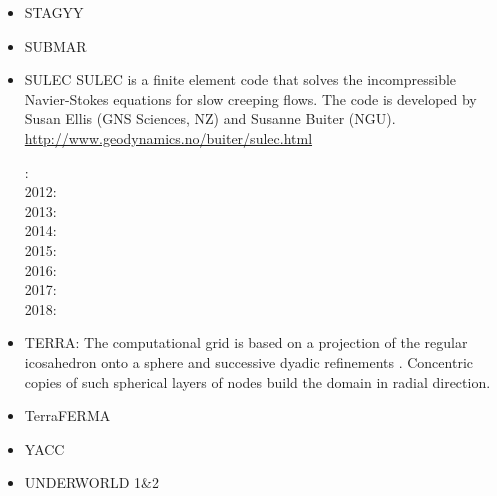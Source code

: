 \begin{itemize}
\item STAGYY
\cite{rota11}
\cite{yadl14}
\cite{crta14}
\cite{gult19}

\item SUBMAR

\cite{masr06}
\cite{masp07}
\cite{roms10}


\item SULEC
SULEC is a finite element code that solves the incompressible Navier-Stokes equations 
for slow creeping flows. The code is developed by Susan Ellis 
(GNS Sciences, NZ) and Susanne Buiter (NGU). 
\url{http://www.geodynamics.no/buiter/sulec.html}

: \cite{qube11}\cite{ellw11}\\
2012: \cite{buit12}\cite{tebu12}\cite{crsg12}\cite{grel12}\\
2013: \cite{ghbu13}\\
2014: \cite{ghbu14}\cite{qubu14}\\
2015: \cite{nabu15}\\
2016: \cite{zwsn16}\\
2017: \cite{nabp17}\\
2018: \cite{tebu18}











\item TERRA:
The computational grid is based on a projection of the regular icosahedron onto a 
sphere and successive dyadic refinements \cite{bafr85}.  Concentric copies of such  
spherical layers of nodes build the domain in radial direction.

\cite{baum83}
\cite{glat88}
\cite{buba95}
\cite{burb97}\cite{yang97}
\cite{burl98}
\cite{phbs09}\cite{wodd09}\cite{gows09}
\cite{woda11}
\cite{dadb13}
\cite{vade16}

\item TerraFERMA
\cite{wisv14}
\cite{wisv17}
\cite{spmw16}
\cite{ceww17}
\cite{ceww19}


\item YACC
\cite{tosn15}
\cite{tomy16}

\item UNDERWORLD 1\&2


\end{itemize}
